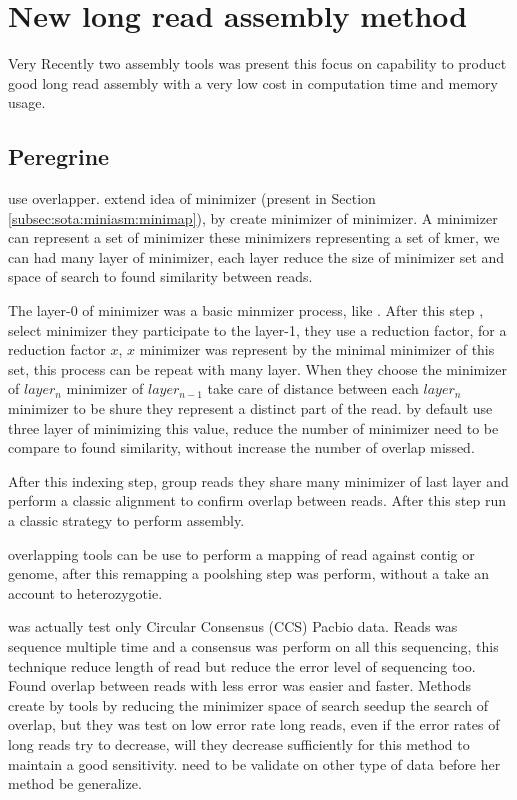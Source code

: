 \documentclass[main]{subfiles}
\begin{document}
\section{New long read assembly method}

Very Recently two assembly tools was present this focus on capability to product good long read assembly with a very low cost in computation time and memory usage.

\subsection{Peregrine}

\newcommand{\shimmer}{}

\peregrine \cite{Peregrine} use \shimmer overlapper. \shimmer extend idea of minimizer (present in Section \ref{subsec:sota:miniasm:minimap}), by create minimizer of minimizer. A minimizer can represent a set of minimizer these minimizers representing a set of kmer, we can had many layer of minimizer, each layer reduce the size of minimizer set and space of search to found similarity between reads.

The layer-0 of minimizer was a basic minmizer process, like \minimap. After this step \shimmer, select minimizer they participate to the layer-1, they use a reduction factor, for a reduction factor $x$, $x$ minimizer was represent by the minimal minimizer of this set, this process can be repeat with many layer. When they choose the minimizer of $layer_n$ minimizer of $layer_{n-1}$ \shimmer take care of distance between each $layer_n$ minimizer to be shure they represent a distinct part of the read.  \shimmer by default use three layer of minimizing this value, reduce the number of minimizer need to be compare to found similarity, without increase the number of overlap missed.

After this indexing step, \shimmer group reads they share many minimizer of last layer and perform a classic alignment to confirm overlap between reads. After this step \peregrine run a classic \OLC strategy to perform assembly.

\shimmer overlapping tools can be use to perform a mapping of read against contig or genome, after this remapping a poolshing step was perform, without a take an account to heterozygotie.

\peregrine was actually test only Circular Consensus (CCS) Pacbio data. Reads was sequence multiple time and a consensus was perform on all this sequencing, this technique reduce length of read but reduce the error level of sequencing too. Found overlap between reads with less error was easier and faster. Methods create by \peregrine tools by reducing the minimizer space of search seedup the search of overlap, but they was test on low error rate long reads, even if the error rates of long reads try to decrease, will they decrease sufficiently for this method to maintain a good sensitivity. \peregrine need to be validate on other type of data before her method be generalize.
\end{document}
